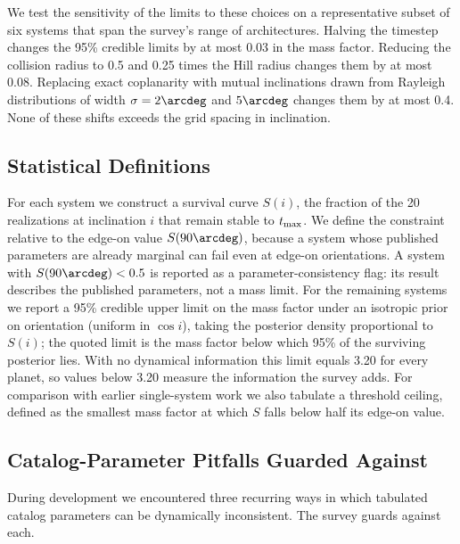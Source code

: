\documentclass[twocolumn]{aastex631}
\begin{document}
We test the sensitivity of the limits to these choices on a representative
subset of six systems that span the survey's range of architectures.
Halving the timestep changes the 95\% credible limits by at most 0.03 in
the mass factor. Reducing the collision radius to 0.5 and 0.25 times the
Hill radius changes them by at most 0.08. Replacing exact coplanarity with
mutual inclinations drawn from Rayleigh distributions of width
$\sigma = 2\arcdeg$ and $5\arcdeg$ changes them by at most 0.4. None of
these shifts exceeds the grid spacing in inclination.

\subsection{Statistical Definitions} \label{sec:stats}

For each system we construct a survival curve $S(i)$, the fraction of the
20 realizations at inclination $i$ that remain stable to $t_{\rm max}$. We
define the constraint relative to the edge-on value $S(90\arcdeg)$,
because a system whose published parameters are already marginal can fail
even at edge-on orientations. A system with $S(90\arcdeg) < 0.5$ is
reported as a parameter-consistency flag: its result describes the
published parameters, not a mass limit. For the remaining systems we
report a 95\% credible upper limit on the mass factor under an isotropic
prior on orientation (uniform in $\cos i$), taking the posterior density
proportional to $S(i)$; the quoted limit is the mass factor below which
95\% of the surviving posterior lies. With no dynamical information this
limit equals 3.20 for every planet, so values below 3.20 measure the
information the survey adds. For comparison with earlier single-system
work we also tabulate a threshold ceiling, defined as the smallest mass
factor at which $S$ falls below half its edge-on value.

\subsection{Catalog-Parameter Pitfalls Guarded Against}
\label{sec:artifacts}

During development we encountered three recurring ways in which tabulated
catalog parameters can be dynamically inconsistent. The survey guards
against each.
\end{document}
